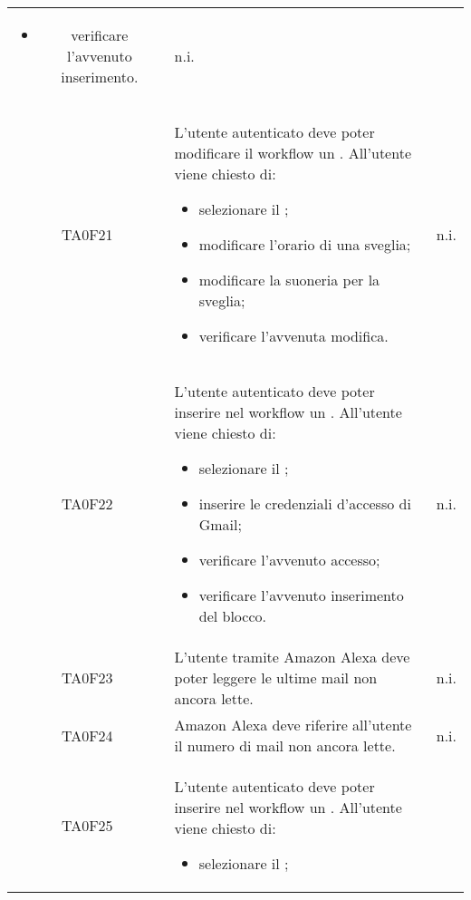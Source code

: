 \begin{center}
\begin{longtable}{ c m{12cm} c }
\begin{itemize}
		\item verificare l'avvenuto inserimento.										
	\end{itemize} 																																								& n.i. \\  	
	TA0F21   & L'utente autenticato deve poter modificare il workflow un \BSveglia. All'utente viene chiesto di: \begin{itemize}										
		\item selezionare il \BSveglia;										
		\item modificare l'orario di una sveglia;										
		\item modificare la suoneria per la sveglia;										
		\item verificare l'avvenuta modifica.										
	\end{itemize}    																																							& n.i. \\
	TA0F22   & L'utente autenticato deve poter inserire nel workflow un \BMail. All'utente viene chiesto di: \begin{itemize}										
		\item selezionare il \BMail;										
		\item inserire le credenziali d'accesso di Gmail;										
		\item verificare l'avvenuto accesso;										
		\item verificare l'avvenuto inserimento del blocco.										
	\end{itemize} 																																								& n.i. \\        
	TA0F23   & L'utente tramite Amazon Alexa deve poter leggere le ultime mail non ancora lette.                                              										& n.i. \\
	TA0F24   & Amazon Alexa deve riferire all'utente il numero di mail non ancora lette.                                                										& n.i. \\
	TA0F25   & L'utente autenticato deve poter inserire nel workflow un \BTelegram. All'utente viene chiesto di: \begin{itemize}										
		\item selezionare il \BTelegram;										

\end{itemize}
\end{longtable}
\end{center}
